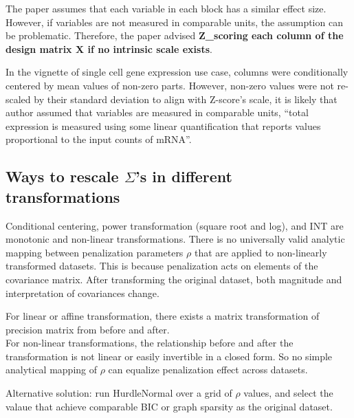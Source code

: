 \documentclass[
]{article}
\begin{document}
The paper assumes that each variable in each block has a similar effect
size. However, if variables are not measured in comparable units, the
assumption can be problematic. Therefore, the paper advised
\textbf{Z\_scoring each column of the design matrix X if no intrinsic
scale exists}.

In the vignette of single cell gene expression use case, columns were
conditionally centered by mean values of non-zero parts. However,
non-zero values were not re-scaled by their standard deviation to align
with Z-score's scale, it is likely that author assumed that variables
are measured in comparable units, ``total expression is measured using
some linear quantification that reports values proportional to the input
counts of mRNA''.

\hypertarget{ways-to-rescale-sigmas-in-different-transformations}{%
\subsection{\texorpdfstring{Ways to rescale \(\Sigma\)'s in different
transformations}{Ways to rescale \textbackslash Sigma's in different transformations}}\label{ways-to-rescale-sigmas-in-different-transformations}}

Conditional centering, power transformation (square root and log), and
INT are monotonic and non-linear transformations. There is no
universally valid analytic mapping between penalization parameters
\(\rho\) that are applied to non-linearly transformed datasets. This is
because penalization acts on elements of the covariance matrix. After
transforming the original dataset, both magnitude and interpretation of
covariances change.

For linear or affine transformation, there exists a matrix
transformation of precision matrix from before and after.\\
For non-linear transformations, the relationship before and after the
transformation is not linear or easily invertible in a closed form. So
no simple analytical mapping of \(\rho\) can equalize penalization
effect across datasets.

Alternative solution: run HurdleNormal over a grid of \(\rho\) values,
and select the valaue that achieve comparable BIC or graph sparsity as
the original dataset.
\end{document}
